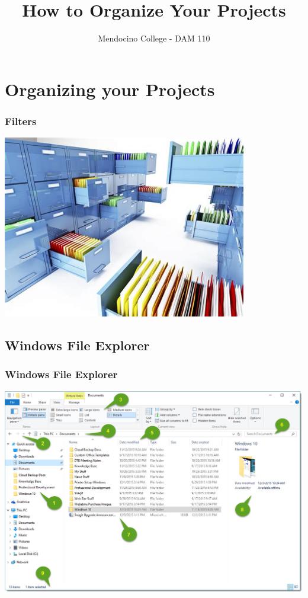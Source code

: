 \documentclass{beamer}
\title{How to Organize Your Projects}
\author{Mendocino College - DAM 110}
\date{\vspace{-5em}}
\begin{document}
	{
		\begin{frame}
			\vspace{-35pt}
			\maketitle
		\end{frame}
	}

	\section{Organizing your Projects}
		\begin{frame}
		\frametitle{Filters}
		\begin{center}
			\includegraphics[width = 0.8\textwidth]{images/th (1).jpg}
		\end{center}
	\end{frame}
	
			\subsection{Windows File Explorer}		
	\begin{frame}
		\frametitle{Windows File Explorer}
\begin{center}
	\includegraphics[width=.7\textwidth]{images/win10-fileexplorer-overview-callouts_0.jpg}
	\end{center}
		\end{frame}
	
\end{document}
